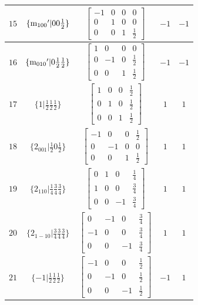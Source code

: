 \documentclass[fleqn,8pt]{jsarticle}
\begin{document}
\begin{longtable}{ccccc}
$ 15 $ & $ \{{\rm m}_{100}{}'|0 0 \frac{1}{2}\} $ & $ \begin{bmatrix} -1 & 0 & 0 & 0 \\ 0 & 1 & 0 & 0 \\ 0 & 0 & 1 & \frac{1}{2} \end{bmatrix} $ & $ -1 $ & $ -1 $ \\ \hline
$ 16 $ & $ \{{\rm m}_{010}{}'|0 \frac{1}{2} \frac{1}{2}\} $ & $ \begin{bmatrix} 1 & 0 & 0 & 0 \\ 0 & -1 & 0 & \frac{1}{2} \\ 0 & 0 & 1 & \frac{1}{2} \end{bmatrix} $ & $ -1 $ & $ -1 $ \\ \hline
$ 17 $ & $ \{1|\frac{1}{2} \frac{1}{2} \frac{1}{2}\} $ & $ \begin{bmatrix} 1 & 0 & 0 & \frac{1}{2} \\ 0 & 1 & 0 & \frac{1}{2} \\ 0 & 0 & 1 & \frac{1}{2} \end{bmatrix} $ & $ 1 $ & $ 1 $ \\ \hline
$ 18 $ & $ \{2{}_{001}|\frac{1}{2} 0 \frac{1}{2}\} $ & $ \begin{bmatrix} -1 & 0 & 0 & \frac{1}{2} \\ 0 & -1 & 0 & 0 \\ 0 & 0 & 1 & \frac{1}{2} \end{bmatrix} $ & $ 1 $ & $ 1 $ \\ \hline
$ 19 $ & $ \{2{}_{110}|\frac{1}{4} \frac{3}{4} \frac{3}{4}\} $ & $ \begin{bmatrix} 0 & 1 & 0 & \frac{1}{4} \\ 1 & 0 & 0 & \frac{3}{4} \\ 0 & 0 & -1 & \frac{3}{4} \end{bmatrix} $ & $ 1 $ & $ 1 $ \\ \hline
$ 20 $ & $ \{2{}_{1-10}|\frac{3}{4} \frac{3}{4} \frac{3}{4}\} $ & $ \begin{bmatrix} 0 & -1 & 0 & \frac{3}{4} \\ -1 & 0 & 0 & \frac{3}{4} \\ 0 & 0 & -1 & \frac{3}{4} \end{bmatrix} $ & $ 1 $ & $ 1 $ \\ \hline
$ 21 $ & $ \{-1|\frac{1}{2} \frac{1}{2} \frac{1}{2}\} $ & $ \begin{bmatrix} -1 & 0 & 0 & \frac{1}{2} \\ 0 & -1 & 0 & \frac{1}{2} \\ 0 & 0 & -1 & \frac{1}{2} \end{bmatrix} $ & $ -1 $ & $ 1 $ \\ \hline

\end{longtable}
\end{document}
